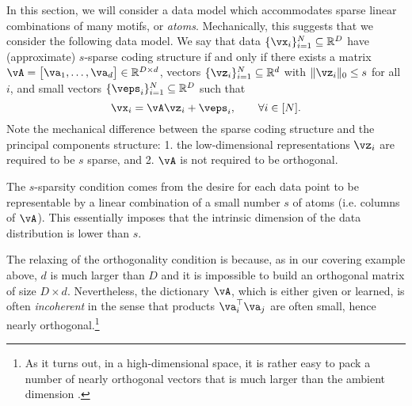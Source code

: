 \documentclass[\toplevelprefix/book-main.tex]{subfiles}
\begin{document}
In this section, we will consider a data model which accommodates sparse linear combinations of many motifs, or \textit{atoms}. Mechanically, this suggests that we consider the following data model. We say that data \(\{\vx_{i}\}_{i = 1}^{N} \subseteq \R^{D}\) have (approximate) \(s\)-sparse coding structure if and only if there exists a matrix \(\vA = \mat{\va_{1}, \dots, \va_{d}} \in \R^{D \times d}\), vectors \(\{\vz_{i}\}_{i = 1}^{N} \subseteq \R^{d}\) with \(\norm{\vz_{i}}_{0} \leq s\) for all \(i\), and small vectors \(\{\veps_{i}\}_{i = 1}^{N} \subseteq \R^{D}\) such that
\begin{equation}\label{eq:vectorized_sparse_dl_dgp}
    \vx_{i} = \vA\vz_{i} + \veps_{i}, \qquad \forall i \in [N].
\end{equation}
Note the mechanical difference between the sparse coding structure and the principal components structure: 1. the low-dimensional representations \(\vz_{i}\) are required to be \(s\) sparse, and 2. \(\vA\) is not required to be orthogonal. 

The \(s\)-sparsity condition comes from the desire for each data point to be representable by a linear combination of a small number \(s\) of atoms (i.e. columns of \(\vA\)). This essentially imposes that the intrinsic dimension of the data distribution is lower than \(s\).

The relaxing of the orthogonality condition is because, as in our covering example above, \(d\) is much larger than \(D\) and it is impossible to build an orthogonal matrix of size \(D \times d\). Nevertheless, the dictionary \(\vA\), which is either given or learned, is often \textit{incoherent} in the sense that products \(\va_{i}^{\top}\va_{j}\) are often small, hence nearly orthogonal.\footnote{As it turns out, in a high-dimensional space, it is rather easy to pack a number of nearly orthogonal vectors that is much larger than the ambient dimension \cite{Wright-Ma-2022}. } 
\end{document}
